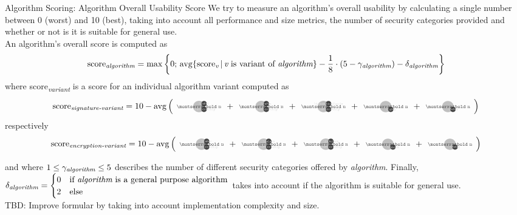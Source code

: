 \documentclass[11pt,english,a4paper, landscape]{scrartcl}
\begin{document}
	\newpage
	\begin{algorithmbox}{Algorithm Scoring: Algorithm Overall Usability Score}
		\scriptsize
		We try to measure an algorithm's overall usability by calculating a single number between 0 (worst) and 10 (best), taking into account all performance and size metrics, the number of security categories provided and whether or not is it is suitable for general use.\\

		An algorithm's overall score is computed as
		\begin{align*}
			\textnormal{score\textsubscript{\itshape algorithm}} = \max\left\{0;\,\operatorname{avg}\{\textnormal{score}_\textnormal{\itshape v}\,|\, \textnormal{{\itshape v} is variant of {\itshape algorithm}}\} - \frac{1}{8}\cdot\left(5-\gamma_\textnormal{\itshape algorithm}\right) - \delta_\textnormal{\itshape algorithm}\right\}
		\end{align*}
		where \textnormal{score\textsubscript{\itshape variant}} is a score for an individual algorithm variant computed as
				\begin{align*}
				\textnormal{score\textsubscript{\itshape signature-variant}} = 10 - \avg\left({\scriptsize
				\tripleicon{\montserratbold n}{\faMicrochip}{themegreylight!50}{0.6}{\faKey} + %
				\tripleicon{\montserratbold n}{\faMicrochip}{themegreylight!50}{0.6}{\faPen} + %
				\tripleicon{\montserratbold n}{\faMicrochip}{themegreylight!50}{0.6}{\faQuestionCircle} + %
				\doubleicon{\montserratbold n}{\faPen}{themegreylight!50}{0.6}+ %
				\doubleicon{\montserratbold n}{\faKey}{themegreylight!50}{0.6}
				}\right)
			\end{align*}
		respectively
			\begin{align*}
				\textnormal{score\textsubscript{\itshape encryption-variant}} = 10 - \avg\left({\scriptsize
				\tripleicon{\montserratbold n}{\faMicrochip}{themegreylight!50}{0.6}{\faKey} + %
				\tripleicon{\montserratbold n}{\faMicrochip}{themegreylight!50}{0.6}{\faLock} + %
				\tripleicon{\montserratbold n}{\faMicrochip}{themegreylight!50}{0.6}{\faUnlock} + %
				\doubleicon{\montserratbold n}{\faLock}{themegreylight!50}{0.6}+ %
				\doubleicon{\montserratbold n}{\faKey}{themegreylight!50}{0.6}
				}\right)
			\end{align*}

		and where $1\leq\gamma_\textnormal{\itshape algorithm}\leq 5$ describes the number of different security categories offered by {\itshape algorithm}. Finally, $\delta_\textnormal{\itshape algorithm} = \begin{cases}
		0 & \textnormal{if {\itshape algorithm} is a general purpose algorithm} \\
		2 & \textnormal{else}
	\end{cases}$	takes into account if the algorithm is suitable for general use.\\

	\textcolor{themeaccentsecondary}{TBD: Improve formular by taking into account implementation complexity and size.}\\
   \end{algorithmbox}
\end{document}
